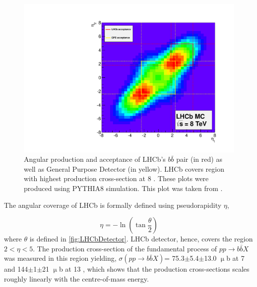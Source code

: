\begin{figure}
	\centering
	\includegraphics[scale = 0.3]{figs/detector/Acceptance.pdf}
	\caption{Angular production and acceptance of LHCb's $b\bar{b}$ pair (in red) as well as General Purpose Detector (in yellow). LHCb covers region with highest production cross-section at 8 \tev. These plots were produced using PYTHIA8 \cite{pythia8} simulation. This plot was taken from \cite{acceptance}.}
	\label{fig:Acceptance}
\end{figure}

The angular coverage of LHCb is formally defined using pseudorapidity $\eta$, 

\begin{equation}
	\eta = -\ln (\tan\frac{\theta}{2})
\end{equation}	
where $\theta$ is defined in \autoref{fig:LHCbDetector}. \Gls{LHCb} detector, hence, covers the region $2<\eta<5$. The production cross-section of the fundamental process of $pp\rightarrow b\bar{b}X$ was measured in this region yielding, $\sigma (pp\rightarrow b\bar{b}X)$= 75.3$\pm$5.4$\pm$13.0 $\upmu$b at 7 \tev \cite{LHCb-PAPER-2010-002} and 144$\pm$1$\pm$21 $\upmu$b at 13 \tev \cite{LHCb-PAPER-2016-031}, which shows that the production cross-sections scales roughly linearly with the centre-of-mass energy.

